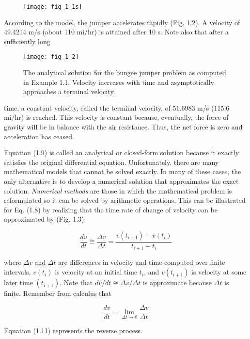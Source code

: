 \documentclass[../main.tex]{subfiles}
\begin{document}
\begin{figure}[H]
	\centering
	\texttt{[image: fig\_1\_1s]}
   \label{fig:fig_1_1s}
\end{figure}



According to the model, the jumper accelerates rapidly (Fig. 1.2). A velocity of
49.4214 m/s (about 110 mi/hr) is attained after 10 s. Note also that after a sufficiently long

\begin{figure}[H]
	\centering
	\texttt{[image: fig\_1\_2]}
   \caption{\textsf{The analytical solution for the bungee jumper problem as computed in Example 1.1. Velocity
increases with time and asymptotically approaches a terminal velocity.}}
   \label{fig:fig_1_2}
\end{figure}

time, a constant velocity, called the terminal velocity, of 51.6983 m/s (115.6 mi/hr) is
reached. This velocity is constant because, eventually, the force of gravity will be in balance with the air resistance. Thus, the net force is zero and acceleration has ceased.


Equation (1.9) is called an analytical or closed-form solution because it exactly satisfies the original differential equation. Unfortunately, there are many mathematical models
that cannot be solved exactly. In many of these cases, the only alternative is to develop a
numerical solution that approximates the exact solution.
\textit{Numerical methods} are those in which the mathematical problem is reformulated so it
can be solved by arithmetic operations. This can be illustrated for Eq. (1.8) by realizing that
the time rate of change of velocity can be approximated by (Fig. 1.3):

\begin{equation}
\tag{1.11}
\dfrac{dv}{dt}\cong\dfrac{\Delta v}{\Delta t} = \dfrac{v(t_{i+1})-v(t_i)}{t_{i+1}-t_i}
\end{equation}

where $\Delta v$ and $\Delta t$ are differences in velocity and time computed over finite intervals, $v(t_i)$
is velocity at an initial time $t_i$, and $v(t_{i+1})$ is velocity at some later time $(t_{i+1})$. Note that
$dv/dt \cong \Delta v / \Delta t$ is approximate because $ \Delta t$ is finite. Remember from calculus that

$$\dfrac{dv}{dt} = \lim_{\Delta t\to 0} \dfrac{\Delta v}{ \Delta t}$$

Equation (1.11) represents the reverse process.
\end{document}
